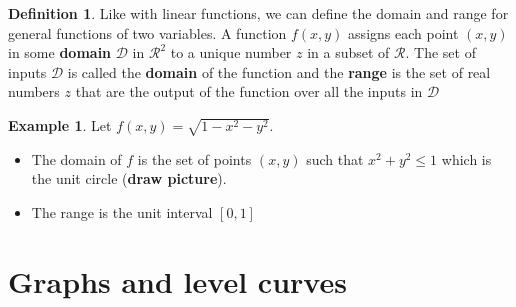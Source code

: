 \documentclass[
]{book}
\theoremstyle{definition}
\newtheorem{definition}{Definition}[chapter]
\theoremstyle{definition}
\newtheorem{example}{Example}[chapter]
\theoremstyle{definition}
\theoremstyle{definition}
\theoremstyle{remark}
\begin{document}
\begin{definition}
Like with linear functions, we can define the domain and range for general functions of two variables. A function \(f(x, y)\) assigns each point \((x, y)\) in some \textbf{domain} \(\mathcal{D}\) in \(\mathcal{R}^2\) to a unique number \(z\) in a subset of \(\mathcal{R}\). The set of inputs \(\mathcal{D}\) is called the \textbf{domain} of the function and the \textbf{range} is the set of real numbers \(z\) that are the output of the function over all the inputs in \(\mathcal{D}\)
\end{definition}

\begin{example}

Let \(f(x, y) = \sqrt{1 - x^2 - y^2}\).

\begin{itemize}
\item
  The domain of \(f\) is the set of points \((x, y)\) such that \(x^2 + y^2 \leq 1\) which is the unit circle (\textbf{draw picture}).
\item
  The range is the unit interval \([0, 1]\)
\end{itemize}

\end{example}

\hypertarget{graphs-and-level-curves}{%
\section{Graphs and level curves}\label{graphs-and-level-curves}}
\end{document}
